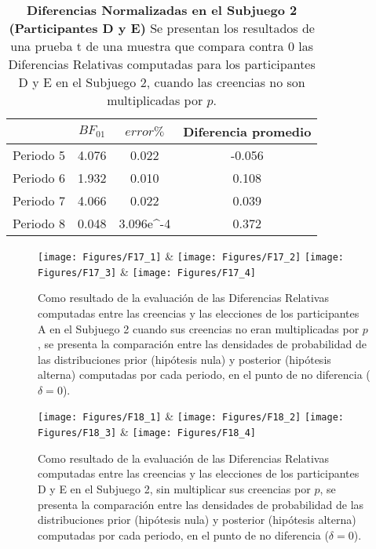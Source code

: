 \begin{table}[h]
\caption[Diferencias Relativas en el Subjuego 2, omitiendo la multiplicación por $p$; Participantes D y E (Pruebas t de una muestra)]{\textbf{Diferencias Normalizadas en el Subjuego 2 (Participantes D y E)} Se presentan los resultados de una prueba t de una muestra que compara contra 0 las Diferencias Relativas computadas para los participantes D y E en el Subjuego 2, cuando las creencias no son multiplicadas por $p$.}
\label{DRnop-S2-DyE-B}
\centering
\begin{tabular}{l | c c | c}
\toprule
\textbf{} & \textbf{$BF_{01}$} & \textbf{$error\%$} & \textbf{Diferencia promedio}\\
\midrule
Periodo 5 & 4.076 & 0.022 & -0.056\\
Periodo 6 & 1.932 & 0.010 & 0.108\\
Periodo 7 & 4.066 & 0.022 & 0.039\\
Periodo 8 & 0.048 & 3.096e^-4 & 0.372\\
\bottomrule
\end{tabular}
\end{table}
  

\begin{figure}[hp]
\centering
\texttt{[image: Figures/F17\_1]} & \texttt{[image: Figures/F17\_2]} 
\texttt{[image: Figures/F17\_3]} & \texttt{[image: Figures/F17\_4]} 
\decoRule
\caption[Evaluación de las Diferencias Relativas entre creencias (omitiendo la multiplicación por $p$) y elecciones en los participantes A en el Subjuego 2 (Factor de Bayes)]{Como resultado de la evaluación de las Diferencias Relativas computadas entre las creencias y las elecciones de los participantes A en el Subjuego 2 cuando sus creencias no eran multiplicadas por $p$, se presenta la comparación entre las densidades de probabilidad de las distribuciones prior (hipótesis nula) y posterior (hipótesis alterna) computadas por cada periodo, en el punto de no diferencia ($\delta = 0$).}
\label{fig:DRnop_S2_A}
\end{figure}  


\begin{figure}[hp]
\centering
\texttt{[image: Figures/F18\_1]} & \texttt{[image: Figures/F18\_2]} 
\texttt{[image: Figures/F18\_3]} & \texttt{[image: Figures/F18\_4]} 
\decoRule
\caption[Evaluación de las Diferencias Relativas entre creencias (omitiendo la multiplicación por $p$) y elecciones en los participantes D y E en el Subjuego 2 (Factor de Bayes)]{Como resultado de la evaluación de las Diferencias Relativas computadas entre las creencias y las elecciones de los participantes D y E en el Subjuego 2, sin multiplicar sus creencias por $p$, se presenta la comparación entre las densidades de probabilidad de las distribuciones prior (hipótesis nula) y posterior (hipótesis alterna) computadas por cada periodo, en el punto de no diferencia ($\delta = 0$).}
\label{fig:DRnop_S2_DyE}
\end{figure}  

